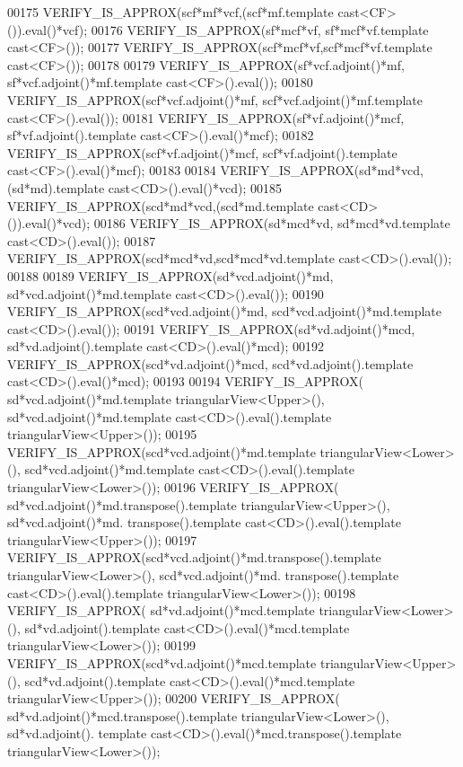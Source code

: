\begin{DoxyCode}
00175   VERIFY\_IS\_APPROX(scf*mf*vcf,(scf*mf.template cast<CF>()).eval()*vcf);
00176   VERIFY\_IS\_APPROX(sf*mcf*vf, sf*mcf*vf.template cast<CF>());
00177   VERIFY\_IS\_APPROX(scf*mcf*vf,scf*mcf*vf.template cast<CF>());
00178 
00179   VERIFY\_IS\_APPROX(sf*vcf.adjoint()*mf,  sf*vcf.adjoint()*mf.template cast<CF>().eval());
00180   VERIFY\_IS\_APPROX(scf*vcf.adjoint()*mf, scf*vcf.adjoint()*mf.template cast<CF>().eval());
00181   VERIFY\_IS\_APPROX(sf*vf.adjoint()*mcf,  sf*vf.adjoint().template cast<CF>().eval()*mcf);
00182   VERIFY\_IS\_APPROX(scf*vf.adjoint()*mcf, scf*vf.adjoint().template cast<CF>().eval()*mcf);
00183 
00184   VERIFY\_IS\_APPROX(sd*md*vcd, (sd*md).\textcolor{keyword}{template} cast<CD>().eval()*vcd);
00185   VERIFY\_IS\_APPROX(scd*md*vcd,(scd*md.template cast<CD>()).eval()*vcd);
00186   VERIFY\_IS\_APPROX(sd*mcd*vd, sd*mcd*vd.template cast<CD>().eval());
00187   VERIFY\_IS\_APPROX(scd*mcd*vd,scd*mcd*vd.template cast<CD>().eval());
00188 
00189   VERIFY\_IS\_APPROX(sd*vcd.adjoint()*md,  sd*vcd.adjoint()*md.template cast<CD>().eval());
00190   VERIFY\_IS\_APPROX(scd*vcd.adjoint()*md, scd*vcd.adjoint()*md.template cast<CD>().eval());
00191   VERIFY\_IS\_APPROX(sd*vd.adjoint()*mcd,  sd*vd.adjoint().template cast<CD>().eval()*mcd);
00192   VERIFY\_IS\_APPROX(scd*vd.adjoint()*mcd, scd*vd.adjoint().template cast<CD>().eval()*mcd);
00193 
00194   VERIFY\_IS\_APPROX( sd*vcd.adjoint()*md.template triangularView<Upper>(),  sd*vcd.adjoint()*md.template 
      cast<CD>().eval().template triangularView<Upper>());
00195   VERIFY\_IS\_APPROX(scd*vcd.adjoint()*md.template triangularView<Lower>(), scd*vcd.adjoint()*md.template 
      cast<CD>().eval().template triangularView<Lower>());
00196   VERIFY\_IS\_APPROX( sd*vcd.adjoint()*md.transpose().template triangularView<Upper>(),  sd*vcd.adjoint()*md.
      transpose().template cast<CD>().eval().template triangularView<Upper>());
00197   VERIFY\_IS\_APPROX(scd*vcd.adjoint()*md.transpose().template triangularView<Lower>(), scd*vcd.adjoint()*md.
      transpose().template cast<CD>().eval().template triangularView<Lower>());
00198   VERIFY\_IS\_APPROX( sd*vd.adjoint()*mcd.template triangularView<Lower>(),  sd*vd.adjoint().template 
      cast<CD>().eval()*mcd.template triangularView<Lower>());
00199   VERIFY\_IS\_APPROX(scd*vd.adjoint()*mcd.template triangularView<Upper>(), scd*vd.adjoint().template 
      cast<CD>().eval()*mcd.template triangularView<Upper>());
00200   VERIFY\_IS\_APPROX( sd*vd.adjoint()*mcd.transpose().template triangularView<Lower>(),  sd*vd.adjoint().
      template cast<CD>().eval()*mcd.transpose().template triangularView<Lower>());

\end{DoxyCode}
